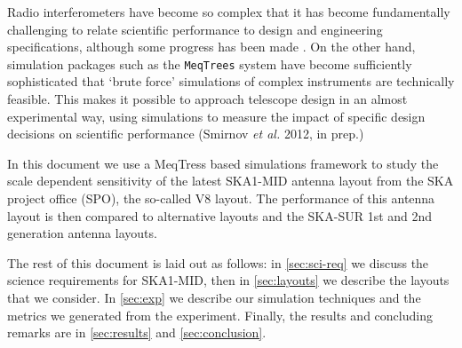 \documentclass[sfheadings,a4paper,times,9pt,floats,floatfix]{article}
\begin{document}
Radio interferometers have become so complex that it has become fundamentally challenging to relate
scientific performance to design and engineering specifications, although some progress has been made 
\cite{rb,wnj}. On the other hand, simulation packages such as the
\texttt{MeqTrees} system \cite{meqtrees} have become sufficiently sophisticated that `brute
force' simulations of complex instruments are technically feasible. This makes it possible to approach telescope design
in an almost experimental way, using simulations to measure the impact of specific design decisions on scientific
performance (Smirnov {\it et al.} 2012, in prep.)

In this document we use a MeqTress based simulations framework to study the scale dependent sensitivity of the latest
SKA1-MID antenna layout from the SKA project office (SPO), the so-called V8 layout. The performance of this
antenna layout is then compared to alternative layouts and the SKA-SUR 1st and 2nd generation antenna
layouts.

The rest of this document is laid out as follows: in \autoref{sec:sci-req} we discuss the science requirements for SKA1-MID, then
in \autoref{sec:layouts} we describe the layouts that we consider. In \autoref{sec:exp} we describe our simulation
techniques and the metrics we generated from the experiment. Finally, the results and concluding remarks are in
\autoref{sec:results} and \autoref{sec:conclusion}.
\end{document}
